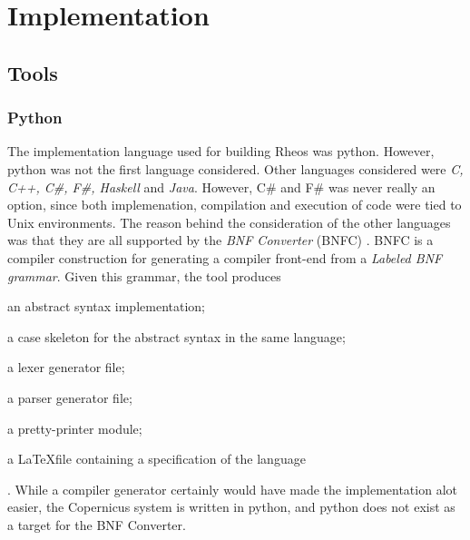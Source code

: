\chapter{Implementation}\label{chap:implementation}


%
%
%

\section{Tools}

\subsection{Python}
The implementation language used for building Rheos was
python. However, python was not the first language considered. Other
languages considered were \emph{C, C++, C\#, F\#, Haskell} and
\emph{Java}. However, C\# and F\# was never really an option, since
both implemenation, compilation and execution of code were tied to
Unix environments. The reason behind the consideration of the other
languages was that they are all supported by the \emph{BNF Converter}
(BNFC) \citep{bnfc:online}. BNFC is a compiler construction for
generating a compiler front-end from a \emph{Labeled BNF
  grammar}. Given this grammar, the tool produces
\begin{inparaenum}[(1)]
\item an abstract syntax implementation;
\item a case skeleton for the abstract syntax in the same language;
\item a lexer generator file;
\item a parser generator file;
\item a pretty-printer module;
\item a \LaTeX file containing a specification of the language
\end{inparaenum} \citep{bnfc:online}.
While a compiler generator certainly would have made the
implementation alot easier, the Copernicus system is written in
python, and python does not exist as a target for the BNF Converter.


